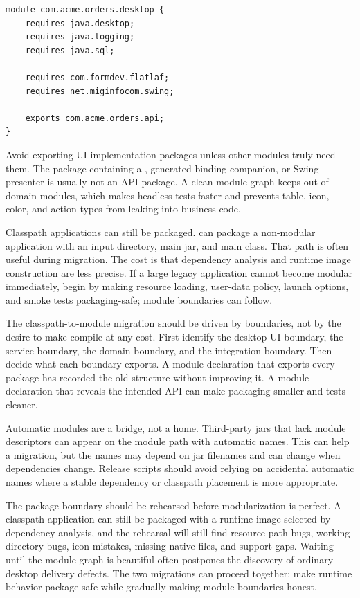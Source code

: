 \begin{lstlisting}[caption={A small module declaration for a Swing desktop application.}]
module com.acme.orders.desktop {
    requires java.desktop;
    requires java.logging;
    requires java.sql;

    requires com.formdev.flatlaf;
    requires net.miginfocom.swing;

    exports com.acme.orders.api;
}
\end{lstlisting}

Avoid exporting UI implementation packages unless other modules truly need them. The package containing a , generated binding companion, or Swing presenter is usually not an API package. A clean module graph keeps  out of domain modules, which makes headless tests faster and prevents table, icon, color, and action types from leaking into business code.

Classpath applications can still be packaged.  can package a non-modular application with an input directory, main jar, and main class. That path is often useful during migration. The cost is that dependency analysis and runtime image construction are less precise. If a large legacy application cannot become modular immediately, begin by making resource loading, user-data policy, launch options, and smoke tests packaging-safe; module boundaries can follow.

The classpath-to-module migration should be driven by boundaries, not by the desire to make  compile at any cost. First identify the desktop UI boundary, the service boundary, the domain boundary, and the integration boundary. Then decide what each boundary exports. A module declaration that exports every package has recorded the old structure without improving it. A module declaration that reveals the intended API can make packaging smaller and tests cleaner.

Automatic modules are a bridge, not a home. Third-party jars that lack module descriptors can appear on the module path with automatic names. This can help a migration, but the names may depend on jar filenames and can change when dependencies change. Release scripts should avoid relying on accidental automatic names where a stable dependency or classpath placement is more appropriate.

The package boundary should be rehearsed before modularization is perfect. A classpath application can still be packaged with a runtime image selected by dependency analysis, and the rehearsal will still find resource-path bugs, working-directory bugs, icon mistakes, missing native files, and support gaps. Waiting until the module graph is beautiful often postpones the discovery of ordinary desktop delivery defects. The two migrations can proceed together: make runtime behavior package-safe while gradually making module boundaries honest.

